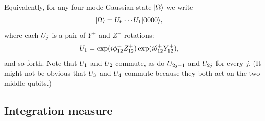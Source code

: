 Equivalently, for any four-mode Gaussian state ${\left\vert{\Omega}\right\rangle}$ we write
\begin{align}
	{\left\vert{\Omega}\right\rangle} &= U_6 \cdots U_1 {\left\vert{0000}\right\rangle},
\end{align}
where each $U_j$ is a pair of $Y^{\pm}$ and $Z^{\pm}$ rotations:
\begin{align}
	U_1 &= \exp(i\phi_{12}^+ Z_{12}^+) \exp({i\theta_{12}^+ Y_{12}^+}),
\end{align}
and so forth. %
Note that $U_1$ and $U_2$ commute, as do $U_{2j-1}$ and $U_{2j}$ for every $j$. (It might not be obvious that $U_3$ and $U_4$ commute because they both act on the two middle qubits.) %




\subsection{Integration measure}

